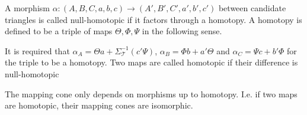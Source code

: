     \begin{definition}
        A morphism $\alpha : (A,B,C,a,b,c) \rightarrow (A',B',C',a',b',c')$ between candidate triangles is called null-homotopic if it factors through a homotopy. A homotopy is defined to be a triple of maps $\Theta, \Phi, \Psi$ in the following sense.
        \begin{center}
        \end{center}
        It is required that $\alpha_A  = \Theta a + \Sigma_{\mathcal{T}}^{-1}(c'\Psi)$, $\alpha_B = \Phi b + a'\Theta$ and $\alpha_C = \Psi c + b'\Phi$ for the triple to be a homotopy.
        Two maps are called homotopic if their difference is null-homotopic
    \end{definition}

    \begin{lemma}
        The mapping cone only depends on morphisms up to homotopy. I.e. if two maps are homotopic, their mapping cones are isomorphic.
    \end{lemma}


